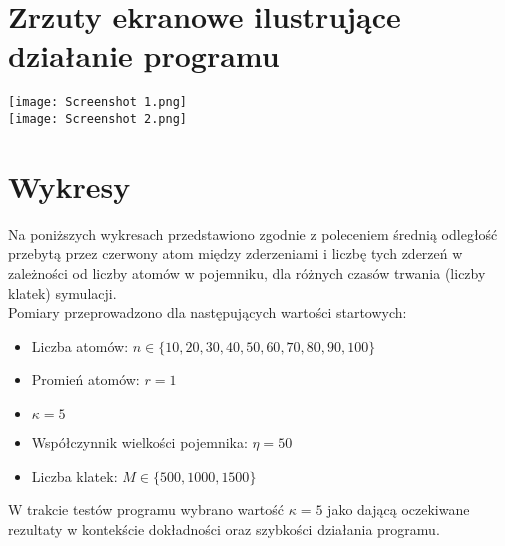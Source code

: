\documentclass{article}
\begin{document}
\section{Zrzuty ekranowe ilustrujące działanie programu}
    \texttt{[image: Screenshot 1.png]}\\
    
    \texttt{[image: Screenshot 2.png]}\\
\section{Wykresy}
Na poniższych wykresach przedstawiono zgodnie z poleceniem średnią odległość przebytą przez czerwony atom między zderzeniami i liczbę tych zderzeń w zależności od liczby atomów w pojemniku, dla różnych czasów trwania (liczby klatek) symulacji.\\
Pomiary przeprowadzono dla następujących wartości startowych:
\begin{itemize}
    \item Liczba atomów: $n\in\{10,20, 30, 40, 50, 60, 70, 80, 90, 100\}$
    \item Promień atomów: $r=1$
    \item $\kappa=5$
    \item Współczynnik wielkości pojemnika: $\eta=50$
    \item Liczba klatek: $M \in \{500, 1000, 1500\}$
\end{itemize}
W trakcie testów programu wybrano wartość $\kappa=5$ jako dającą oczekiwane rezultaty w kontekście dokładności oraz szybkości działania programu.\\
\end{document}
